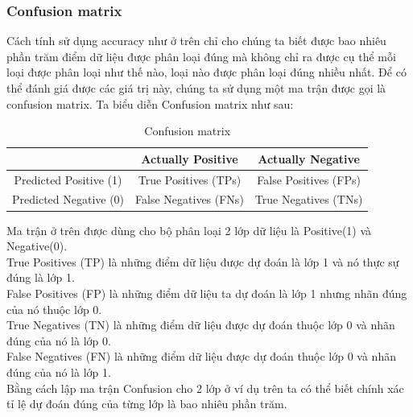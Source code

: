 \subsubsection{Confusion matrix}
Cách tính sử dụng accuracy như ở trên chỉ cho chúng ta biết được bao nhiêu phần trăm điểm dữ liệu được phân loại đúng mà không chỉ ra được cụ thể mỗi loại được phân loại như thế nào, loại nào được phân loại đúng nhiều nhất. Để có thể đánh giá được các giá trị này, chúng ta sử dụng một ma trận được gọi là confusion matrix. Ta biểu diễn Confusion matrix như sau:\\
\begin{table}[H]
    \centering
    \begin{tabular}{|c|c|c|}
    \hline
         &  Actually Positive & Actually Negative\\ \hline
         Predicted Positive (1)& True Positives (TPs) & False Positives (FPs)\\ \hline 
         Predicted Negative (0) & False Negatives (FNs) &  True Negatives (TNs)\\ \hline
    \end{tabular}
    \caption{Confusion matrix}
    \label{tab:confuMatrix}
\end{table}
Ma trận ở trên được dùng cho bộ phân loại 2 lớp dữ liệu là Positive(1) và Negative(0).\\
True Positives (TP) là những điểm dữ liệu được dự đoán là lớp 1 và nó thực sự đúng là lớp 1.\\
False Positives (FP) là những điểm dữ liệu ta dự đoán là lớp 1 nhưng nhãn đúng của nó thuộc lớp 0.\\
True Negatives (TN) là những điểm dữ liệu được dự đoán thuộc lớp 0 và nhãn đúng của nó là lớp 0.\\
False Negatives (FN) là những điểm dữ liệu được dự đoán thuộc lớp 0 và nhãn đúng của nó là lớp 1.\\
Bằng cách lập ma trận Confusion cho 2 lớp ở ví dụ trên ta có thể biết chính xác tỉ lệ dự đoán đúng của từng lớp là bao nhiêu phần trăm.
